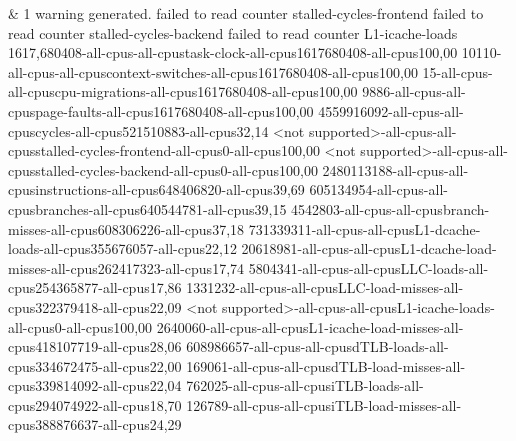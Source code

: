 &
1 warning generated. failed to read counter stalled-cycles-frontend failed to read counter stalled-cycles-backend failed to read counter L1-icache-loads 1617,680408-all-cpus-all-cpustask-clock-all-cpus1617680408-all-cpus100,00 10110-all-cpus-all-cpuscontext-switches-all-cpus1617680408-all-cpus100,00 15-all-cpus-all-cpuscpu-migrations-all-cpus1617680408-all-cpus100,00 9886-all-cpus-all-cpuspage-faults-all-cpus1617680408-all-cpus100,00 4559916092-all-cpus-all-cpuscycles-all-cpus521510883-all-cpus32,14 <not supported>-all-cpus-all-cpusstalled-cycles-frontend-all-cpus0-all-cpus100,00 <not supported>-all-cpus-all-cpusstalled-cycles-backend-all-cpus0-all-cpus100,00 2480113188-all-cpus-all-cpusinstructions-all-cpus648406820-all-cpus39,69 605134954-all-cpus-all-cpusbranches-all-cpus640544781-all-cpus39,15 4542803-all-cpus-all-cpusbranch-misses-all-cpus608306226-all-cpus37,18 731339311-all-cpus-all-cpusL1-dcache-loads-all-cpus355676057-all-cpus22,12 20618981-all-cpus-all-cpusL1-dcache-load-misses-all-cpus262417323-all-cpus17,74 5804341-all-cpus-all-cpusLLC-loads-all-cpus254365877-all-cpus17,86 1331232-all-cpus-all-cpusLLC-load-misses-all-cpus322379418-all-cpus22,09 <not supported>-all-cpus-all-cpusL1-icache-loads-all-cpus0-all-cpus100,00 2640060-all-cpus-all-cpusL1-icache-load-misses-all-cpus418107719-all-cpus28,06 608986657-all-cpus-all-cpusdTLB-loads-all-cpus334672475-all-cpus22,00 169061-all-cpus-all-cpusdTLB-load-misses-all-cpus339814092-all-cpus22,04 762025-all-cpus-all-cpusiTLB-loads-all-cpus294074922-all-cpus18,70 126789-all-cpus-all-cpusiTLB-load-misses-all-cpus388876637-all-cpus24,29
